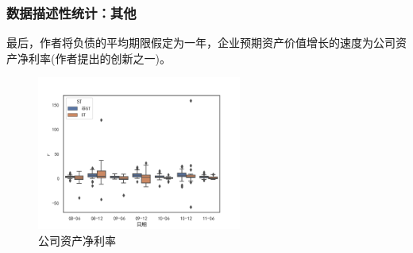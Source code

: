 \documentclass{ctexbeamer}
\begin{document}
\begin{frame}
    \frametitle{数据描述性统计：其他}
    最后，作者将负债的平均期限假定为一年，企业预期资产价值增长的速度为公司资产净利率(作者提出的创新之一)。
    \begin{figure}[H]
        \centering
        \includegraphics[width=0.6\textwidth]{img/r.png}
        \caption{公司资产净利率}
    \end{figure}
\end{frame}
\end{document}
